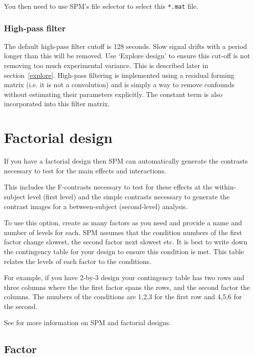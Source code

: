 You then need to use SPM's file selector to select this \verb!*.mat! file.

\subsubsection{High-pass filter}

The default high-pass filter cutoff is 128 seconds. Slow signal drifts with a period longer than this will be removed. Use `Explore design' to ensure this cut-off is not removing too much experimental variance. This is described later in section~\ref{explore}. High-pass filtering is implemented using a residual forming matrix (i.e. it is not a convolution) and is simply a way to remove confounds without estimating their parameters explicitly.  The constant term is also incorporated into this filter matrix.

\section{Factorial design}

If you have a factorial design then SPM can automatically generate the contrasts necessary to test for the main effects and interactions. 

This includes the F-contrasts necessary to test for these effects at the within-subject level (first level) and the simple contrasts necessary to generate the contrast images for a between-subject (second-level) analysis.

To use this option, create as many factors as you need and provide a name and number of levels for each.  SPM assumes that the condition numbers of the first factor change slowest, the second factor next slowest etc. It is best to write down the contingency table for your design to ensure this condition is met. This table relates the levels of each factor to the conditions. 

For example, if you have 2-by-3 design  your contingency table has two rows and three columns where the the first factor spans the rows, and the second factor the columns. The numbers of the conditions are 1,2,3 for the first row and 4,5,6 for the second. 

See \cite{rnah_anova} for more information on SPM and factorial designs.

\subsection{Factor}

